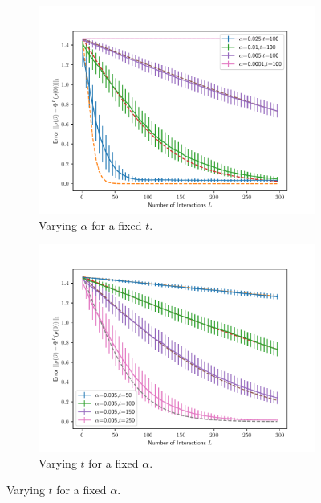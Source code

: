 \documentclass{article}
\begin{document}
\begin{figure}
    \centering
    \begin{subfigure}{0.49\textwidth}
        \includegraphics[width=\textwidth]{numerics/data/error_vs_interaction_fixed_time_2.pdf}     
        \caption{Varying $\alpha$ for a fixed $t$.}
    \end{subfigure}
    \begin{subfigure}{0.49\textwidth}
        \includegraphics[width=\textwidth]{numerics/data/error_vs_interaction_fixed_time.pdf}    
        \caption{Varying $t$ for a fixed $\alpha$.}
    \end{subfigure}


\end{figure}
\end{document}
